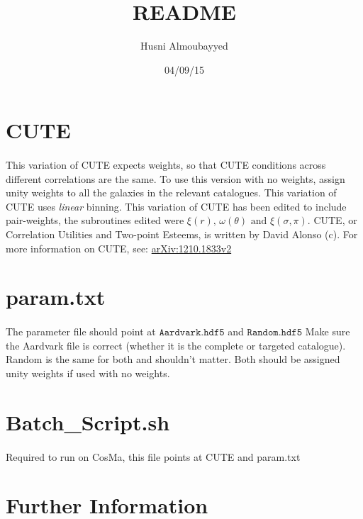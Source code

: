 \documentclass[11pt, oneside]{article}   	%
\title{README}
\author{{\small Husni Almoubayyed}}
\date{04/09/15}							%
\begin{document}
\maketitle
\section{CUTE}
\paragraph{}This variation of CUTE expects weights, so that CUTE conditions across different correlations are the same. To use this version with no weights, assign unity weights to all the galaxies in the relevant catalogues.
This variation of CUTE uses \emph{linear} binning. 
\break
\break
\noindent This variation of CUTE has been edited to include pair-weights, the subroutines edited were  
$\xi(r), \,  \omega(\theta) \, \,  \textrm{and} \, \, \xi(\sigma, \pi)$.
\break
\break
\noindent CUTE, or Correlation Utilities and Two-point Esteems, is written by David Alonso (c). For more information on CUTE, see: \href{arXiv:1210.1833v2}{arXiv:1210.1833v2}
\section{param.txt}
\paragraph{} The parameter file should point at $\mathtt{Aardvark.hdf5}$ and $\mathtt{Random.hdf5}$
Make sure the Aardvark file is correct (whether it is the complete or targeted catalogue). Random is the same for both and shouldn't matter. Both should be assigned unity weights if used with no weights.

\section{Batch\_Script.sh}
\paragraph{} Required to run on CosMa, this file points at CUTE and param.txt

\paragraph{} 


\section{Further Information}
\end{document}
